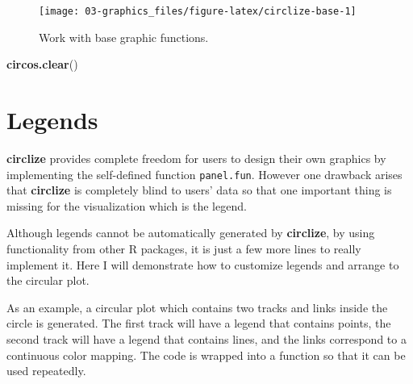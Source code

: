 \documentclass[]{book}
\newenvironment{Shaded}{\begin{snugshade}}{\end{snugshade}}
\newcommand{\KeywordTok}[1]{\textcolor[rgb]{0.13,0.29,0.53}{\textbf{#1}}}
\newcommand{\NormalTok}[1]{#1}
\begin{document}
\begin{figure}

{\centering \texttt{[image: 03-graphics\_files/figure-latex/circlize-base-1]} 

}

\caption{Work with base graphic functions.}\label{fig:circlize-base}
\end{figure}

\begin{Shaded}
\begin{Highlighting}[]
\KeywordTok{circos.clear}\NormalTok{()}
\end{Highlighting}
\end{Shaded}

\chapter{Legends}\label{legends}

\textbf{circlize} provides complete freedom for users to design their
own graphics by implementing the self-defined function
\texttt{panel.fun}. However one drawback arises that \textbf{circlize}
is completely blind to users' data so that one important thing is
missing for the visualization which is the legend.

Although legends cannot be automatically generated by \textbf{circlize},
by using functionality from other R packages, it is just a few more
lines to really implement it. Here I will demonstrate how to customize
legends and arrange to the circular plot.

As an example, a circular plot which contains two tracks and links
inside the circle is generated. The first track will have a legend that
contains points, the second track will have a legend that contains
lines, and the links correspond to a continuous color mapping. The code
is wrapped into a function so that it can be used repeatedly.
\end{document}

